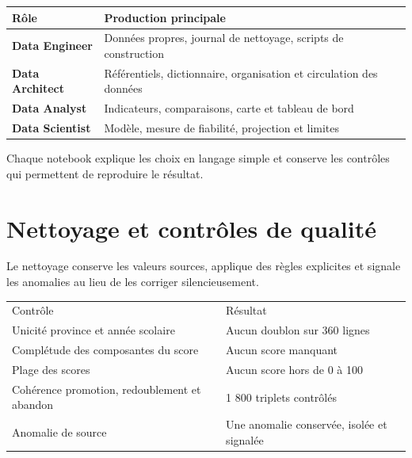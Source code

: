 \documentclass[12pt,a4paper]{article}
\begin{document}
\begin{center}
\end{center}

\begin{tabularx}{\textwidth}{>{\bfseries}p{3.2cm} X}
\toprule
Rôle & Production principale\\
\midrule
Data Engineer & Données propres, journal de nettoyage, scripts de construction\\
Data Architect & Référentiels, dictionnaire, organisation et circulation des données\\
Data Analyst & Indicateurs, comparaisons, carte et tableau de bord\\
Data Scientist & Modèle, mesure de fiabilité, projection et limites\\
\bottomrule
\end{tabularx}

Chaque notebook explique les choix en langage simple et conserve les contrôles qui permettent de reproduire le résultat.
\clearpage
\thispagestyle{fancy}

\section{Nettoyage et contrôles de qualité}
Le nettoyage conserve les valeurs sources, applique des règles explicites et signale les anomalies au lieu de les corriger silencieusement.

\begin{tabularx}{\textwidth}{X p{5.2cm}}
\rowcolor{Navy}\color{white}Contrôle & \color{white}Résultat\\
Unicité province et année scolaire & Aucun doublon sur 360 lignes\\
Complétude des composantes du score & Aucun score manquant\\
Plage des scores & Aucun score hors de 0 à 100\\
Cohérence promotion, redoublement et abandon & 1 800 triplets contrôlés\\
Anomalie de source & Une anomalie conservée, isolée et signalée\\
\end{tabularx}
\end{document}
